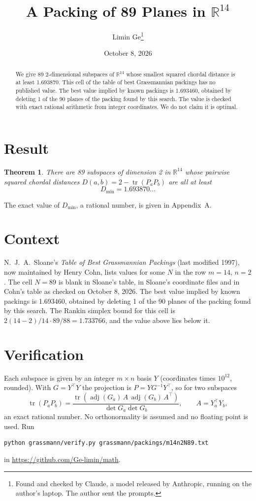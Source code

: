 \documentclass[11pt,a4paper]{article}
\title{A Packing of 89 Planes in $\mathbb{R}^{14}$}
\author{Limin Ge\thanks{Found and checked by Claude, a model released by Anthropic, running on the author's laptop. The author sent the prompts.}}
\date{October 8, 2026}
\newtheorem*{theorem}{Theorem}
\begin{document}
\maketitle
\begin{abstract}
We give 89 2-dimensional subspaces of $\mathbb{R}^{14}$ whose smallest squared chordal distance is at least 1.693870. This cell of the table of best Grassmannian packings has no published value. The best value implied by known packings is 1.693460, obtained by deleting 1 of the 90 planes of the packing found by this search. The value is checked with exact rational arithmetic from integer coordinates. We do not claim it is optimal.
\end{abstract}

\section{Result}
\begin{theorem}
There are 89 subspaces of dimension 2 in $\mathbb{R}^{14}$ whose pairwise squared chordal distances $D(a,b) = 2 - \operatorname{tr}(P_aP_b)$ are all at least
\[ D_{\min} = 1.693870\ldots \]
\end{theorem}
The exact value of $D_{\min}$, a rational number, is given in Appendix~A.


\section{Context}
N.~J.~A.~Sloane's \emph{Table of Best Grassmannian Packings} (last modified 1997), now maintained by Henry Cohn, lists values for some $N$ in the row $m=14$, $n=2$. The cell $N=89$ is blank in Sloane's table, in Sloane's coordinate files and in Cohn's table as checked on October 8, 2026. The best value implied by known packings is 1.693460, obtained by deleting 1 of the 90 planes of the packing found by this search. The Rankin simplex bound for this cell is $2(14-2)/14\cdot 89/88 = 1.733766$, and the value above lies below it.


\section{Verification}
Each subspace is given by an integer $m\times n$ basis $Y$ (coordinates times $10^{12}$, rounded). With $G=Y^\top Y$ the projection is $P=YG^{-1}Y^\top$, so for two subspaces
\[ \operatorname{tr}(P_aP_b)=\frac{\operatorname{tr}(\operatorname{adj}(G_a)\,A\,\operatorname{adj}(G_b)\,A^\top)}{\det G_a\det G_b},\qquad A=Y_a^\top Y_b, \]
an exact rational number. No orthonormality is assumed and no floating point is used. Run
\begin{verbatim}
python grassmann/verify.py grassmann/packings/m14n2N89.txt
\end{verbatim}
in \url{https://github.com/Ge-limin/math}.
\end{document}
